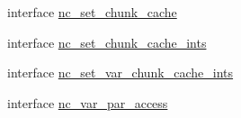 \begin{DoxyCompactItemize}
\item 
interface \hyperlink{interfacenetcdf4__nc__interfaces_1_1nc__set__chunk__cache}{nc\+\_\+set\+\_\+chunk\+\_\+cache}
\item 
interface \hyperlink{interfacenetcdf4__nc__interfaces_1_1nc__set__chunk__cache__ints}{nc\+\_\+set\+\_\+chunk\+\_\+cache\+\_\+ints}
\item 
interface \hyperlink{interfacenetcdf4__nc__interfaces_1_1nc__set__var__chunk__cache__ints}{nc\+\_\+set\+\_\+var\+\_\+chunk\+\_\+cache\+\_\+ints}
\item 
interface \hyperlink{interfacenetcdf4__nc__interfaces_1_1nc__var__par__access}{nc\+\_\+var\+\_\+par\+\_\+access}
\end{DoxyCompactItemize}
